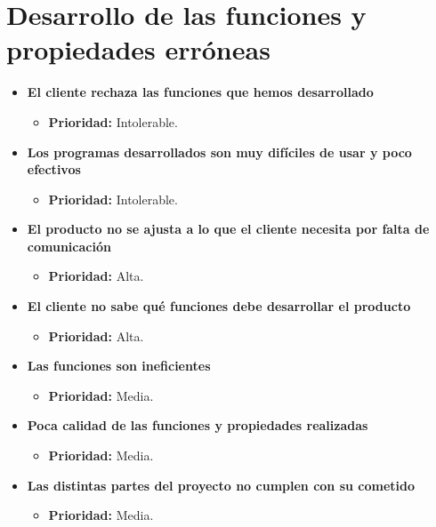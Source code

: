 \documentclass[spanish,a4paper,11pt, twoside]{report}	%
\begin{document}
\section{Desarrollo de las funciones y propiedades erróneas}
	\begin{itemize}

		\item \textbf{El cliente rechaza las funciones que hemos desarrollado}
			\begin{itemize}
				\item \textbf{Prioridad: }Intolerable.
			\end{itemize}

		\item \textbf{Los programas desarrollados son muy difíciles de usar y poco efectivos}	
			\begin{itemize}
				\item \textbf{Prioridad: }Intolerable.
			\end{itemize}

		\item \textbf{El producto no se ajusta a lo que el cliente necesita por falta de comunicación}%
			\begin{itemize}
				\item \textbf{Prioridad: }Alta.
			\end{itemize}
			
		\item \textbf{El cliente no sabe qué funciones debe desarrollar el producto}%
			\begin{itemize}
				\item \textbf{Prioridad: }Alta.
			\end{itemize}
		
		\item \textbf{Las funciones son ineficientes}
			\begin{itemize}
				\item \textbf{Prioridad: }Media.
			\end{itemize}
		
		\item \textbf{Poca calidad de las funciones y propiedades realizadas}
			\begin{itemize}
				\item \textbf{Prioridad: }Media.
			\end{itemize}
		
		\item \textbf{Las distintas partes del proyecto no cumplen con su cometido}
			\begin{itemize}
				\item \textbf{Prioridad: }Media.
			\end{itemize}
		

\end{itemize}
\end{document}
